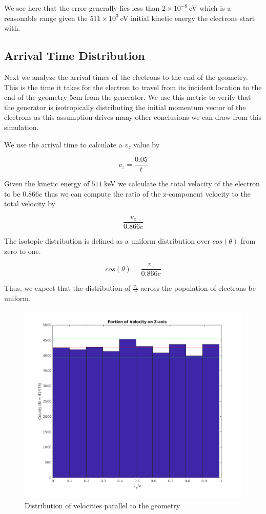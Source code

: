 \documentclass[12pt,letterpaper]{article}
\begin{document}
We see here that the error generally lies less than $2\times10^{-8}~$eV which is a reasonable range given the $511\times10^{3}~$eV initial kinetic energy the electrons start with.

\subsection{Arrival Time Distribution}

Next we analyze the arrival times of the electrons to the end of the geometry. This is the time it takes for the electron to travel from its incident location to the end of the geometry 5cm from the generator. We use this metric to verify that the generator is isotropically distributing the initial momentum vector of the electrons as this assumption drives many other conclusions we can draw from this simulation. 

We use the arrival time to calculate a $v_z$ value by

\[ v_z = \frac{0.05}{t} \]

Given the kinetic energy of $511~$keV we calculate the total velocity of the electron to be $0.866c$ thus we can compute the ratio of the z-component velocity to the total velocity by

\[ \frac{v_z}{0.866c} \]

The isotopic distribution is defined as a uniform distribution over $cos(\theta)$ from zero to one.

\[ cos(\theta) = \frac{v_z}{0.866c} \]

Thus, we expect that the distribution of $\frac{v_z}{v}$ across the population of electrons be uniform.

    \begin{figure}[H]
    \centering
    \includegraphics[width=0.7\linewidth]{img/arrival.png}
    \caption{Distribution of velocities parallel to the geometry}
    \end{figure}
    
\end{document}
